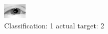 \begin{figure}[h!]
\begin{center}
\includegraphics[width=0.60\columnwidth]{figures/ID2332_class_1_target_2.png}
\end{center}
\caption{ Classification: 1 actual target: 2}
\label{fig:ID2332_class_1_target_2}
\end{figure}
